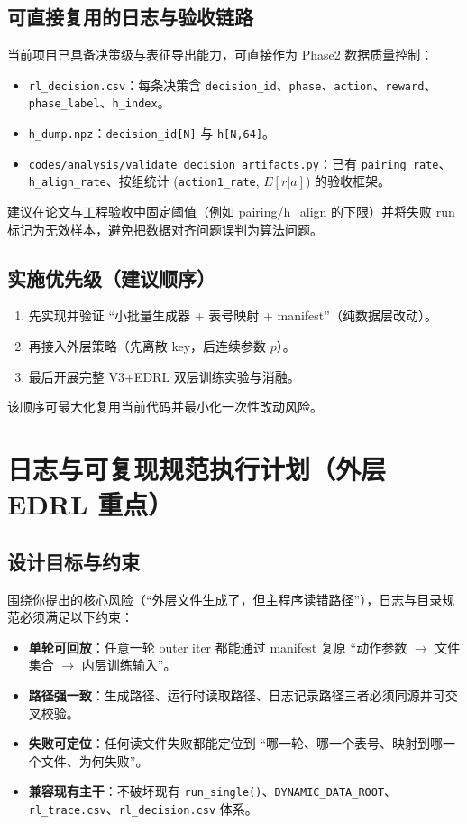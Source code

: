 \documentclass[UTF8,11pt,a4paper]{ctexart}
\begin{document}
\subsection{可直接复用的日志与验收链路}
当前项目已具备决策级与表征导出能力，可直接作为 Phase2 数据质量控制：
\begin{itemize}
\item \texttt{rl\_decision.csv}：每条决策含 \texttt{decision\_id}、\texttt{phase}、\texttt{action}、\texttt{reward}、\texttt{phase\_label}、\texttt{h\_index}。
\item \texttt{h\_dump.npz}：\texttt{decision\_id[N]} 与 \texttt{h[N,64]}。
\item \texttt{codes/analysis/validate\_decision\_artifacts.py}：已有 \texttt{pairing\_rate}、\texttt{h\_align\_rate}、按组统计 (\texttt{action1\_rate}, $E[r|a]$) 的验收框架。
\end{itemize}
建议在论文与工程验收中固定阈值（例如 pairing/h\_align 的下限）并将失败 run 标记为无效样本，避免把数据对齐问题误判为算法问题。

\subsection{实施优先级（建议顺序）}
\begin{enumerate}
\item 先实现并验证 ``小批量生成器 + 表号映射 + manifest''（纯数据层改动）。
\item 再接入外层策略（先离散 key，后连续参数 $p$）。
\item 最后开展完整 V3+EDRL 双层训练实验与消融。
\end{enumerate}
该顺序可最大化复用当前代码并最小化一次性改动风险。

\section{日志与可复现规范执行计划（外层 EDRL 重点）}

\subsection{设计目标与约束}
围绕你提出的核心风险（``外层文件生成了，但主程序读错路径''），日志与目录规范必须满足以下约束：
\begin{itemize}
\item \textbf{单轮可回放}：任意一轮 outer iter 都能通过 manifest 复原 ``动作参数 $\to$ 文件集合 $\to$ 内层训练输入''。
\item \textbf{路径强一致}：生成路径、运行时读取路径、日志记录路径三者必须同源并可交叉校验。
\item \textbf{失败可定位}：任何读文件失败都能定位到 ``哪一轮、哪一个表号、映射到哪一个文件、为何失败''。
\item \textbf{兼容现有主干}：不破坏现有 \texttt{run\_single()}、\texttt{DYNAMIC\_DATA\_ROOT}、\texttt{rl\_trace.csv}、\texttt{rl\_decision.csv} 体系。
\end{itemize}
\end{document}
